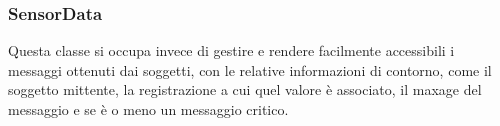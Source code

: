 \subsubsection{SensorData}
Questa classe si occupa invece di gestire e rendere facilmente accessibili i messaggi ottenuti dai soggetti, con le relative informazioni di contorno, come il soggetto mittente, la registrazione a cui quel valore è associato, il maxage del messaggio e se è o meno un messaggio critico. \\

